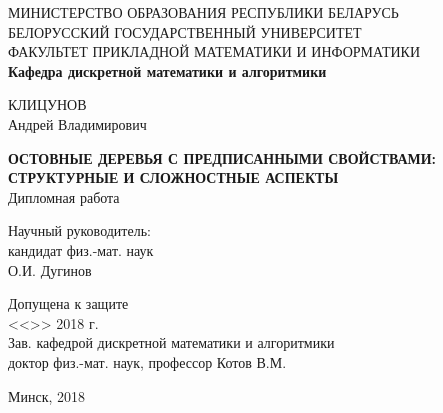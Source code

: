 \begin{titlepage}
    \begin{center}
	{ МИНИСТЕРСТВО ОБРАЗОВАНИЯ РЕСПУБЛИКИ БЕЛАРУСЬ} \\
    	\vspace{1em}
        { БЕЛОРУССКИЙ ГОСУДАРСТВЕННЫЙ УНИВЕРСИТЕТ} \\
    	\vspace{1em}
	{ ФАКУЛЬТЕТ ПРИКЛАДНОЙ МАТЕМАТИКИ И ИНФОРМАТИКИ} \\
    	\vspace{1em}
        {\bf Кафедра дискретной математики и алгоритмики}
    \end{center}

    \vspace{4em}

    \begin{center}
        КЛИЦУНОВ \\ 
        Андрей Владимирович
    \end{center}
    
    \vspace{1em}
        
    \begin{center}
        {\bf ОСТОВНЫЕ ДЕРЕВЬЯ С ПРЕДПИСАННЫМИ СВОЙСТВАМИ: 
        СТРУКТУРНЫЕ И СЛОЖНОСТНЫЕ АСПЕКТЫ} \\
        \vspace{3em}
        { Дипломная работа}
    \end{center}

    \vspace{3em}

    \begin{flushright}
        Научный руководитель:\\
	кандидат физ.-мат. наук \\
	О.И. Дугинов 
    \end{flushright}
    
    \begin{flushleft}
        Допущена к защите \\
        \vspace{0.5em}
        <<\noindent\makebox[20pt]{\rule{20pt}{0.01pt}}>> \noindent\makebox[75pt]{\rule{75pt}{0.01pt}} 2018 г. \\
        \vspace{0.3em}
        Зав. кафедрой дискретной математики и алгоритмики \\
        доктор физ.-мат. наук, профессор Котов В.М.
    \end{flushleft}

    \begin{center}
        { Минск, 2018}
    \end{center}
\end{titlepage}
\newpage
